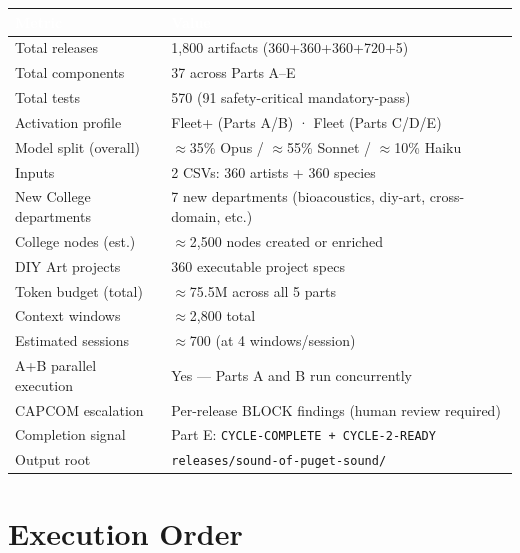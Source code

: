 \documentclass[11pt,letterpaper]{article}
\newcommand{\tblhdr}[1]{\textbf{\sffamily\textcolor{white}{#1}}}
\begin{document}
\begin{center}
\begin{tabularx}{\textwidth}{L{6cm}X}
\toprule
{}
\tblhdr{Metric} & \tblhdr{Value} \\
\midrule
Total releases & 1,800 artifacts (360+360+360+720+5) \\
Total components & 37 across Parts A–E \\
Total tests & 570 (91 safety-critical mandatory-pass) \\
Activation profile & Fleet+ (Parts A/B) · Fleet (Parts C/D/E) \\
Model split (overall) & $\approx$35\% Opus / $\approx$55\% Sonnet / $\approx$10\% Haiku \\
Inputs & 2 CSVs: 360 artists + 360 species \\
New College departments & 7 new departments (bioacoustics, diy-art, cross-domain, etc.) \\
College nodes (est.) & $\approx$2,500 nodes created or enriched \\
DIY Art projects & 360 executable project specs \\
Token budget (total) & $\approx$75.5M across all 5 parts \\
Context windows & $\approx$2,800 total \\
Estimated sessions & $\approx$700 (at 4 windows/session) \\
A+B parallel execution & Yes — Parts A and B run concurrently \\
CAPCOM escalation & Per-release BLOCK findings (human review required) \\
Completion signal & Part E: \texttt{CYCLE-COMPLETE + CYCLE-2-READY} \\
Output root & \texttt{releases/sound-of-puget-sound/} \\
\bottomrule
\end{tabularx}
\end{center}

\section{Execution Order}
\end{document}
